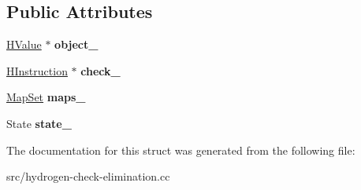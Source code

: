 \subsection*{Public Attributes}
\begin{DoxyCompactItemize}
\item 
\hypertarget{structv8_1_1internal_1_1_h_check_table_entry_af33fccf20bac5b13cdbc90dee9d46fa2}{}\hyperlink{classv8_1_1internal_1_1_h_value}{H\+Value} $\ast$ {\bfseries object\+\_\+}\label{structv8_1_1internal_1_1_h_check_table_entry_af33fccf20bac5b13cdbc90dee9d46fa2}

\item 
\hypertarget{structv8_1_1internal_1_1_h_check_table_entry_a7e3ebe8f88b340e06aa12de4150a2462}{}\hyperlink{classv8_1_1internal_1_1_h_instruction}{H\+Instruction} $\ast$ {\bfseries check\+\_\+}\label{structv8_1_1internal_1_1_h_check_table_entry_a7e3ebe8f88b340e06aa12de4150a2462}

\item 
\hypertarget{structv8_1_1internal_1_1_h_check_table_entry_ac07a54376511e4f3fa9c6d3aa378a668}{}\hyperlink{classv8_1_1internal_1_1_unique_set}{Map\+Set} {\bfseries maps\+\_\+}\label{structv8_1_1internal_1_1_h_check_table_entry_ac07a54376511e4f3fa9c6d3aa378a668}

\item 
\hypertarget{structv8_1_1internal_1_1_h_check_table_entry_ab4d54ec65ca1ff7456078a4710abd115}{}State {\bfseries state\+\_\+}\label{structv8_1_1internal_1_1_h_check_table_entry_ab4d54ec65ca1ff7456078a4710abd115}

\end{DoxyCompactItemize}


The documentation for this struct was generated from the following file\+:\begin{DoxyCompactItemize}
\item 
src/hydrogen-\/check-\/elimination.\+cc\end{DoxyCompactItemize}
